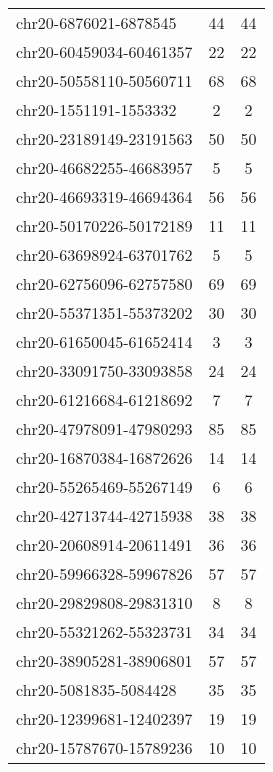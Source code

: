 \documentclass[10pt,letterpaper]{article}
\begin{document}
{\begin{longtable}{lSS}
	chr20-6876021-6878545   & 44     & 44                    \\
	chr20-60459034-60461357 & 22     & 22                    \\
	chr20-50558110-50560711 & 68     & 68                    \\
	chr20-1551191-1553332   & 2      & 2                     \\
	chr20-23189149-23191563 & 50     & 50                    \\
	chr20-46682255-46683957 & 5      & 5                     \\
	chr20-46693319-46694364 & 56     & 56                    \\
	chr20-50170226-50172189 & 11     & 11                    \\
	chr20-63698924-63701762 & 5      & 5                     \\
	chr20-62756096-62757580 & 69     & 69                    \\
	chr20-55371351-55373202 & 30     & 30                    \\
	chr20-61650045-61652414 & 3      & 3                     \\
	chr20-33091750-33093858 & 24     & 24                    \\
	chr20-61216684-61218692 & 7      & 7                     \\
	chr20-47978091-47980293 & 85     & 85                    \\
	chr20-16870384-16872626 & 14     & 14                    \\
	chr20-55265469-55267149 & 6      & 6                     \\
	chr20-42713744-42715938 & 38     & 38                    \\
	chr20-20608914-20611491 & 36     & 36                    \\
	chr20-59966328-59967826 & 57     & 57                    \\
	chr20-29829808-29831310 & 8      & 8                     \\
	chr20-55321262-55323731 & 34     & 34                    \\
	chr20-38905281-38906801 & 57     & 57                    \\
	chr20-5081835-5084428   & 35     & 35                    \\
	chr20-12399681-12402397 & 19     & 19                    \\
	chr20-15787670-15789236 & 10     & 10                    \\

\end{longtable}}
\end{document}
